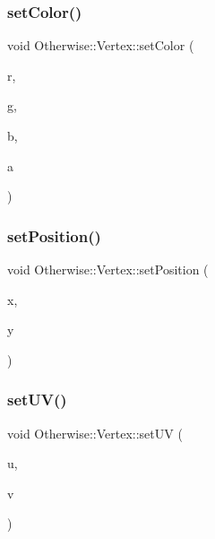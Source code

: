 \subsubsection{\texorpdfstring{set\+Color()}{setColor()}}
{\footnotesize\ttfamily void Otherwise\+::\+Vertex\+::set\+Color (\begin{DoxyParamCaption}\item[{G\+Lubyte}]{r,  }\item[{G\+Lubyte}]{g,  }\item[{G\+Lubyte}]{b,  }\item[{G\+Lubyte}]{a }\end{DoxyParamCaption})\hspace{0.3cm}{\ttfamily [inline]}}

\mbox{\label{struct_otherwise_1_1_vertex_a1a57c304714fee3ed7f582df61cb0654}} 
\subsubsection{\texorpdfstring{set\+Position()}{setPosition()}}
{\footnotesize\ttfamily void Otherwise\+::\+Vertex\+::set\+Position (\begin{DoxyParamCaption}\item[{float}]{x,  }\item[{float}]{y }\end{DoxyParamCaption})\hspace{0.3cm}{\ttfamily [inline]}}

\mbox{\label{struct_otherwise_1_1_vertex_a9d14fae629bb0b7536525d613ca22b4d}} 
\subsubsection{\texorpdfstring{set\+U\+V()}{setUV()}}
{\footnotesize\ttfamily void Otherwise\+::\+Vertex\+::set\+UV (\begin{DoxyParamCaption}\item[{float}]{u,  }\item[{float}]{v }\end{DoxyParamCaption})\hspace{0.3cm}{\ttfamily [inline]}}



